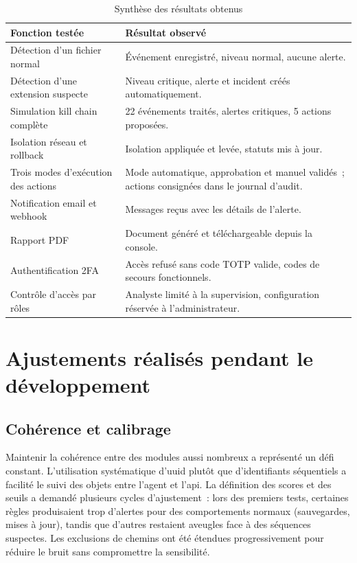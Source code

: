 \begin{table}[htbp]
\centering
\caption{Synthèse des résultats obtenus}
\label{tab:synthese-resultats}
\small
\renewcommand{\arraystretch}{1.3}
\begin{tabularx}{\textwidth}{|p{5.5cm}|X|}
\hline
\textbf{Fonction testée} & \textbf{Résultat observé} \\
\hline
Détection d'un fichier normal & Événement enregistré, niveau normal, aucune alerte. \\
\hline
Détection d'une extension suspecte & Niveau critique, alerte et incident créés automatiquement. \\
\hline
Simulation kill chain complète & 22 événements traités, alertes critiques, 5 actions proposées. \\
\hline
Isolation réseau et rollback & Isolation appliquée et levée, statuts mis à jour. \\
\hline
Trois modes d'exécution des actions & Mode automatique, approbation et manuel validés~; actions consignées dans le journal d'audit. \\
\hline
Notification email et webhook & Messages reçus avec les détails de l'alerte. \\
\hline
Rapport PDF & Document généré et téléchargeable depuis la console. \\
\hline
Authentification 2FA & Accès refusé sans code TOTP valide, codes de secours fonctionnels. \\
\hline
Contrôle d'accès par rôles & Analyste limité à la supervision, configuration réservée à l'administrateur. \\
\hline
\end{tabularx}
\end{table}

\section{Ajustements réalisés pendant le développement}

\subsection{Cohérence et calibrage}

Maintenir la cohérence entre des modules aussi nombreux a représenté un défi constant. L'utilisation systématique d'\gls{uuid} plutôt que d'identifiants séquentiels a facilité le suivi des objets entre l'agent et l'\gls{api}. La définition des scores et des seuils a demandé plusieurs cycles d'ajustement~: lors des premiers tests, certaines règles produisaient trop d'alertes pour des comportements normaux (sauvegardes, mises à jour), tandis que d'autres restaient aveugles face à des séquences suspectes. Les exclusions de chemins ont été étendues progressivement pour réduire le bruit sans compromettre la sensibilité.


